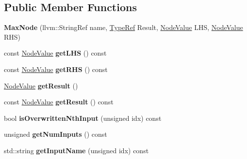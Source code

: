 \subsection*{Public Member Functions}
\begin{DoxyCompactItemize}
\item 
\mbox{\label{classglow_1_1_max_node_a464e94ed3658997168fc7fdddcded233}} 
{\bfseries Max\+Node} (llvm\+::\+String\+Ref name, \hyperlink{structglow_1_1_type}{Type\+Ref} Result, \hyperlink{structglow_1_1_node_value}{Node\+Value} L\+HS, \hyperlink{structglow_1_1_node_value}{Node\+Value} R\+HS)
\item 
\mbox{\label{classglow_1_1_max_node_a75ab1bff5879f4de690e5fa5a01dfa43}} 
const \hyperlink{structglow_1_1_node_value}{Node\+Value} {\bfseries get\+L\+HS} () const
\item 
\mbox{\label{classglow_1_1_max_node_af2d784288bbe9d3955e26d8eb1fdbe51}} 
const \hyperlink{structglow_1_1_node_value}{Node\+Value} {\bfseries get\+R\+HS} () const
\item 
\mbox{\label{classglow_1_1_max_node_a408001932d2d5485ff014cc3de3c5d5d}} 
\hyperlink{structglow_1_1_node_value}{Node\+Value} {\bfseries get\+Result} ()
\item 
\mbox{\label{classglow_1_1_max_node_a57c19e962a48f221fb9c80abafed87a6}} 
const \hyperlink{structglow_1_1_node_value}{Node\+Value} {\bfseries get\+Result} () const
\item 
\mbox{\label{classglow_1_1_max_node_a85efa1207e0b3313f883b07bea59548e}} 
bool {\bfseries is\+Overwritten\+Nth\+Input} (unsigned idx) const
\item 
\mbox{\label{classglow_1_1_max_node_a6141b48b6ddd920e298cadda5663a3a7}} 
unsigned {\bfseries get\+Num\+Inputs} () const
\item 
\mbox{\label{classglow_1_1_max_node_a06fd491b36583f186674beefb941af35}} 
std\+::string {\bfseries get\+Input\+Name} (unsigned idx) const
\item 
\mbox{\label{classglow_1_1_max_node_a50c6bb7f7ff3d901d0ac46199a9548ad}} 

\end{DoxyCompactItemize}
